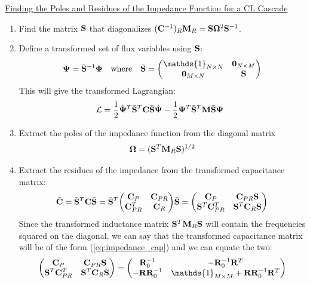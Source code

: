\begin{framed}
\noindent \underline{Finding the Poles and Residues of the Impedance Function for a CL Cascade}
\begin{enumerate}
    \item Find the matrix $\vb{S}$ that diagonalizes $(\vb{C}^{-1})_R \vb{M}_R = \vb{S} \vb{\Omega}^2 \vb{S}^{-1}$.
    \item Define a transformed set of flux variables using $\vb{S}$:
    \begin{equation}
        \vb{\Psi} = \bar{\vb{S}}^{-1} \vb{\Phi} \quad\text{where}\quad \bar{\vb{S}} = \mqty(\mathds{1}_{N \times N} & \vb{0}_{N \times M} \\ \vb{0}_{M \times N} & \vb{S})
    \end{equation}
    This will give the transformed Lagrangian:
    \begin{equation}
        \mathcal{L} = \frac{1}{2}\dot{\vb{\Psi}}^T \bar{\vb{S}}^T \vb{C} \bar{\vb{S}} \dot{\vb{\Psi}} - \frac{1}{2}\vb{\Psi}^T \bar{\vb{S}}^T \vb{M} \bar{\vb{S}} \vb{\Psi}^{\phantom{^T}}
    \end{equation}
    \item Extract the poles of the impedance function from the diagonal matrix 
    \begin{equation}
        \vb{\Omega} = (\vb{S}^T \vb{M}_R \vb{S})^{1/2}
    \end{equation}
    \item Extract the residues of the impedance from the transformed capacitance matrix:
    \begin{equation}
        \bar{\vb{C}} = \bar{\vb{S}}^T \vb{C} \bar{\vb{S}} = \bar{\vb{S}}^T\mqty(\vb{C}_P & \vb{C}_{PR} \\ \vb{C}_{PR}^T & \vb{C}_R )\bar{\vb{S}} = \mqty(\vb{C}_P & \vb{C}_{PR} \vb{S} \\ \vb{S}^T \vb{C}_{PR}^T & \vb{S}^T \vb{C}_R \vb{S})
    \end{equation}
    Since the transformed inductance matrix $\vb{S}^T \vb{M}_R \vb{S}$ will contain the frequencies squared on the diagonal, we can say that the transformed capacitance matrix will be of the form (\ref{eq:impedance_cap}) and we can equate the two:
    \begin{equation}
        \mqty(\vb{C}_P & \vb{C}_{PR} \vb{S} \\ \vb{S}^T \vb{C}_{PR}^T & \vb{S}^T \vb{C}_R \vb{S}) = \mqty( \vb{R}_0^{-1} & -\vb{R}_0^{-1}\vb{R}^T \\ -\vb{R} \vb{R}_0^{-1} & \mathds{1}_{M\times M} + \vb{R}\vb{R}_0^{-1}\vb{R}^T)

\end{equation}
\end{enumerate}
\end{framed}

